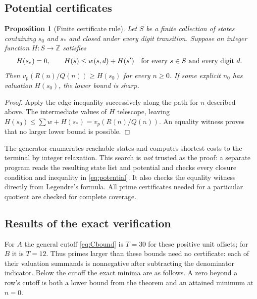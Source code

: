 \documentclass[11pt]{article}
\newtheorem{proposition}[theorem]{Proposition}
\theoremstyle{definition}
\theoremstyle{remark}
\newcommand{\Z}{\mathbb Z}
\newcommand{\vp}{v_p}
\begin{document}
\subsection{Potential certificates}
\begin{proposition}[Finite certificate rule]\label{prop:potential}
Let $S$ be a finite collection of states containing $s_0$ and $s_*$ and
closed under every digit transition. Suppose an integer function
$H:S\to\Z$ satisfies
\begin{equation}\label{eq:potential}
 H(s_*)=0,\qquad H(s)\leq w(s,d)+H(s')
 \quad\hbox{for every }s\in S\hbox{ and every digit }d.
\end{equation}
Then $\vp(R(n)/Q(n))\geq H(s_0)$ for every $n\geq0$.
If some explicit $n_0$ has valuation $H(s_0)$, the lower bound is sharp.
\end{proposition}
\begin{proof}
Apply the edge inequality successively along the path for $n$ described
above. The intermediate values of $H$ telescope, leaving
$H(s_0)\leq\sum w+H(s_*)=\vp(R(n)/Q(n))$. An equality witness proves
that no larger lower bound is possible.
\end{proof}
The generator enumerates reachable states and computes shortest costs
to the terminal by integer relaxation. This search is \emph{not} trusted
as the proof: a separate program reads the resulting state list and
potential and checks every closure condition and inequality in
\eqref{eq:potential}. It also checks the equality witness directly from
Legendre's formula. All prime certificates needed for a particular
quotient are checked for complete coverage.

\subsection{Results of the exact verification}
For $A$ the general cutoff \eqref{eq:Cbound} is $T=30$ for these
positive unit offsets; for $B$ it is $T=12$. Thus primes larger than
these bounds need no certificate: each of their valuation summands is
nonnegative after subtracting the denominator indicator. Below the
cutoff the exact minima are as follows. A zero beyond a row's cutoff
is both a lower bound from the theorem and an attained minimum at $n=0$.
\end{document}
